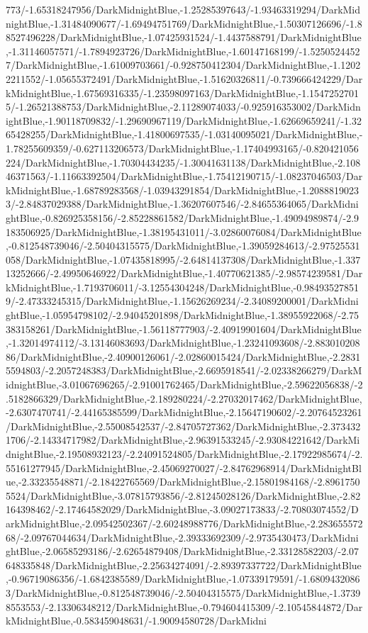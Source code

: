 {\begin{tikzternal}
{773/-1.65318247956/DarkMidnightBlue,-1.25285397643/-1.93463319294/DarkMidnightBlue,-1.31484090677/-1.69494751769/DarkMidnightBlue,-1.50307126696/-1.88527496228/DarkMidnightBlue,-1.07425931524/-1.4437588791/DarkMidnightBlue,-1.31146057571/-1.7894923726/DarkMidnightBlue,-1.60147168199/-1.52505244527/DarkMidnightBlue,-1.61009703661/-0.928750412304/DarkMidnightBlue,-1.12022211552/-1.05655372491/DarkMidnightBlue,-1.51620326811/-0.739666424229/DarkMidnightBlue,-1.67569316335/-1.23598097163/DarkMidnightBlue,-1.15472527015/-1.26521388753/DarkMidnightBlue,-2.11289074033/-0.925916353002/DarkMidnightBlue,-1.90118709832/-1.29690967119/DarkMidnightBlue,-1.62669659241/-1.3265428255/DarkMidnightBlue,-1.41800697535/-1.03140095021/DarkMidnightBlue,-1.78255609359/-0.627113206573/DarkMidnightBlue,-1.17404993165/-0.820421056224/DarkMidnightBlue,-1.70304434235/-1.30041631138/DarkMidnightBlue,-2.10846371563/-1.11663392504/DarkMidnightBlue,-1.75412190715/-1.08237046503/DarkMidnightBlue,-1.68789283568/-1.03943291854/DarkMidnightBlue,-1.20888190233/-2.84837029388/DarkMidnightBlue,-1.36207607546/-2.84655364065/DarkMidnightBlue,-0.826925358156/-2.85228861582/DarkMidnightBlue,-1.49094989874/-2.9183506925/DarkMidnightBlue,-1.38195431011/-3.02860076084/DarkMidnightBlue,-0.812548739046/-2.50404315575/DarkMidnightBlue,-1.39059284613/-2.97525531058/DarkMidnightBlue,-1.07435818995/-2.64814137308/DarkMidnightBlue,-1.33713252666/-2.49950646922/DarkMidnightBlue,-1.40770621385/-2.98574239581/DarkMidnightBlue,-1.7193706011/-3.12554304248/DarkMidnightBlue,-0.984935278519/-2.47333245315/DarkMidnightBlue,-1.15626269234/-2.34089200001/DarkMidnightBlue,-1.05954798102/-2.94045201898/DarkMidnightBlue,-1.38955922068/-2.75383158261/DarkMidnightBlue,-1.56118777903/-2.40919901604/DarkMidnightBlue,-1.32014974112/-3.13146083693/DarkMidnightBlue,-1.23241093608/-2.88301020886/DarkMidnightBlue,-2.40900126061/-2.02860015424/DarkMidnightBlue,-2.28315594803/-2.2057248383/DarkMidnightBlue,-2.6695918541/-2.02338266279/DarkMidnightBlue,-3.01067696265/-2.91001762465/DarkMidnightBlue,-2.59622056838/-2.5182866329/DarkMidnightBlue,-2.189280224/-2.27032017462/DarkMidnightBlue,-2.6307470741/-2.44165385599/DarkMidnightBlue,-2.15647190602/-2.20764523261/DarkMidnightBlue,-2.55008542537/-2.84705727362/DarkMidnightBlue,-2.3734321706/-2.14334717982/DarkMidnightBlue,-2.96391533245/-2.93084221642/DarkMidnightBlue,-2.19508932123/-2.24091524805/DarkMidnightBlue,-2.17922985674/-2.55161277945/DarkMidnightBlue,-2.45069270027/-2.84762968914/DarkMidnightBlue,-2.33235548871/-2.18422765569/DarkMidnightBlue,-2.15801984168/-2.89617505524/DarkMidnightBlue,-3.07815793856/-2.81245028126/DarkMidnightBlue,-2.82164398462/-2.17464582029/DarkMidnightBlue,-3.09027173833/-2.70803074552/DarkMidnightBlue,-2.09542502367/-2.60248988776/DarkMidnightBlue,-2.28365557268/-2.09767044634/DarkMidnightBlue,-2.39333692309/-2.9735430473/DarkMidnightBlue,-2.06585293186/-2.62654879408/DarkMidnightBlue,-2.33128582203/-2.07648335848/DarkMidnightBlue,-2.25634274091/-2.89397337722/DarkMidnightBlue,-0.96719086356/-1.6842385589/DarkMidnightBlue,-1.07339179591/-1.68094320863/DarkMidnightBlue,-0.812548739046/-2.50404315575/DarkMidnightBlue,-1.37398553553/-2.13306348212/DarkMidnightBlue,-0.794604415309/-2.10545844872/DarkMidnightBlue,-0.583459048631/-1.90094580728/DarkMidni}
\end{tikzternal}}
